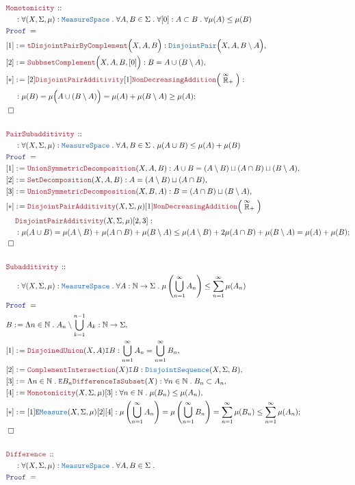 \documentclass[12pt]{scrartcl}
\newcommand{\TYPE}[1]{\textcolor{NavyBlue}{\mathtt{#1}}}
\newcommand{\LOGIC}[1]{\textcolor{Blue}{\mathtt{#1}}}
\newcommand{\THM}[1]{\textcolor{Maroon}{\mathtt{#1}}}
\renewcommand{\.}{\; . \;}
\newcommand{\de}{: \kern 0.1pc =}
\newcommand{\Theorem}[2]{& \THM{#1} \, :: \, #2 \\ & \Proof = \\ }
\newcommand{\NewLine}{\\ & \kern 1pc}
\newcommand{\Page}[1]{ \begin{align*} #1 \end{align*}   }
\newcommand{\Intro}{\LOGIC{I}}
\newcommand{\Elim}{\LOGIC{E}}
\newcommand{\Nat}{\mathbb{N} }
\newcommand{\EReals}{\stackrel{\mathclap{\infty}}{\mathbb{R}}}
\newcommand{\Say}[3]{& #1 \de #2 : #3, \\}
\newcommand{\Conclude}[3]{& #1 \de #2 : #3; \\}
\newcommand{\QED}{\; \square}
\newcommand{\EndProof}{& \QED \\}
\newcommand{\Proof}{\LOGIC{Proof} \; }
\newcommand{\Measure}{\TYPE{Measure}}
\newcommand{\MS}{\TYPE{MeasureSpace}}
\begin{document}
\Page{
	\Theorem{Monotonicity}
	{
		\NewLine :		
		\forall (X,\Sigma,\mu) : \MS \.
		\forall A,B \in \Sigma \.
		\forall [0] : A \subset B \.
		\forall \mu(A) \le \mu(B)
	}
	\Say{[1]}{\THM{tDisjointPairByComplement}\Big(X,A,B\Big)}
	{
		\TYPE{DisjointPair}\Big( X, A, B \setminus A \Big)
	}
	\Say{[2]}{\THM{SubbsetComplement}\Big(X,A,B,[0]\Big)}
	{
		B = A \cup (B \setminus A)
	}
	\Conclude{[*]}{[2]\THM{DisjointPairAdditivity}[1]\THM{NonDecreasingAddition}\Big( \EReals_+\Big)}
	{
		\NewLine :		
		\mu(B) =
		\mu\Big( A \cup (B \setminus A) \Big) =
		\mu(A) + \mu(B \setminus A) \ge	
		\mu(A) 
	}
	\EndProof
	\\
	\Theorem{PairSubadditivity}
	{
		\NewLine :		
		\forall (X,\Sigma,\mu) : \MS \.
		\forall A,B \in \Sigma \.
		\mu(A \cup B) \le \mu(A) + \mu(B)
	}
	\Say{[1]}{\THM{UnionSymmetricDecomposition}(X,A,B)}
	{
		A \cup B = (A \setminus B) \sqcup (A \cap B) \sqcup (B \setminus A)
	}
	\Say{[2]}{\THM{SetDecomposition}(X,A,B)}
	{
		A  = (A \setminus B) \sqcup (A \cap B)
	}
	\Say{[3]}{\THM{UnionSymmetricDecomposition}(X,B,A)}
	{
		B = (A \cap B) \sqcup (B \setminus A)
	}
	\Conclude{[*]}{
		\THM{DisjointPairAdditivity}(X,\Sigma,\mu)[1]	
		\THM{NonDecreasingAddition}\Big( \EReals_+\Big) \NewLine
		\THM{DisjointPairAdditivity}(X,\Sigma,\mu)[2,3]
	}
	{
		\NewLine :		
		\mu(A \cup B ) =
		\mu(A \setminus B) + \mu(A \cap B) + \mu(B \setminus A) \le 
		\mu(A \setminus B) + 2\mu(A \cap B) + \mu(B \setminus A) = 
		\mu(A) + \mu(B)
	}
	\EndProof
	\\
	\Theorem{Subadditivity}
	{
		\NewLine :		
		\forall (X,\Sigma,\mu) : \MS \.
		\forall A : \Nat \to \Sigma \.
		\mu\left( \bigcup^\infty_{n=1} A_n \right) \le \sum^\infty_{n=1} \mu(A_n)
	}
	\Say{B}{\Lambda n \in \Nat \. A_n \setminus \bigcup^{n-1}_{k=1} A_k }
	{
		\Nat \to \Sigma
	}
	\Say{[1]}{\THM{DisjoinedUnion}(X,A)\Intro B}
	{
		\bigcup^\infty_{n=1} A_n = \bigcup^\infty_{n=1} B_n
	}
	\Say{[2]}{\THM{ComplementIntersection}(X)\Intro B}
	{
		\TYPE{DisjointSequence}(X, \Sigma, B)
	}
	\Say{[3]}{ \Lambda n \in \Nat \. \Elim B_n \THM{DifferenceIsSubset}(X)}
	{
		\forall n \in \Nat \. B_n \subset A_n
	}
	\Say{[4]}{ \THM{Monotonicity}(X,\Sigma,\mu) [3]}
	{
		\forall n \in \Nat \. \mu(B_n) \le \mu(A_n)	
	}
	\Conclude{[*]}{ [1]\Elim \Measure(X,\Sigma,\mu)[2][4]}
	{
		\mu\left( \bigcup^\infty_{n=1} A_n \right) =
		\mu\left( \bigcup^\infty_{n=1} B_n \right) =
		\sum^\infty_{n=1} \mu(B_n) \le
		\sum^\infty_{n=1} \mu(A_n)
	}
	\EndProof
	\\
	\Theorem{Difference}
	{
		\NewLine :		
		\forall (X,\Sigma,\mu) : \MS \.
		\forall A,B \in \Sigma \.
}}
\end{document}
